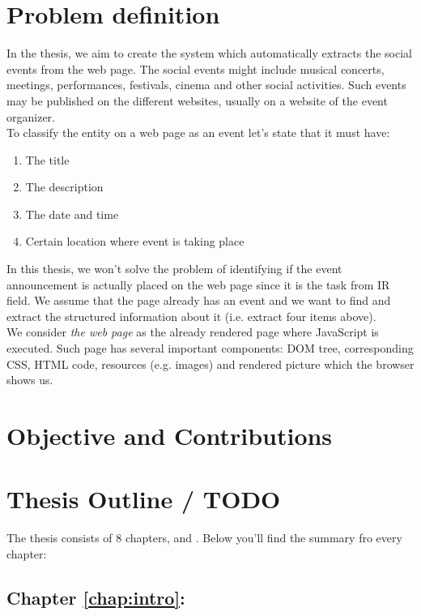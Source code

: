 \section{Problem definition}
In the thesis, we aim to create the system which automatically extracts the social events from the web page. The social events might include musical concerts, meetings, performances, festivals, cinema and other social activities. Such events may be published on the different websites, usually on a website of the event organizer.\\

To classify the entity on a web page as an event let's state that it must have:
\begin{enumerate}
    \item The title
    \item The description
    \item The date and time
    \item Certain location where event is taking place
\end{enumerate}

In this thesis, we won't solve the problem of identifying if the event announcement is actually placed on the web page since it is the task from IR field. We assume that the page already has an event and we want to find and extract the structured information about it (i.e. extract four items above).\\

We consider \textit{the web page} as the already rendered page where JavaScript is executed. Such page has several important components: DOM tree, corresponding CSS, HTML code, resources (e.g. images) and rendered picture which the browser shows us.\\  

\section{Objective and Contributions}

\section{Thesis Outline / TODO}
The thesis consists of 8 chapters,  and . Below you'll find the summary fro every chapter:

\subsection* {Chapter \ref{chap:intro}: }
